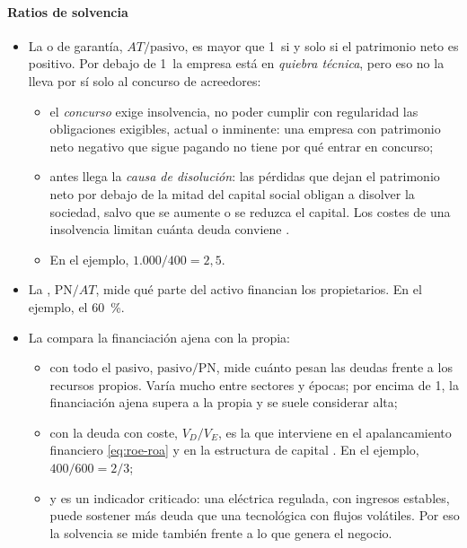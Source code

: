 \documentclass[11pt]{article}
\begin{document}
\begin{infografia}[H]
\centering
\caption{Los equilibrios patrimoniales}\label{figu:equilibrios-patrimoniales}
\end{infografia}

\paragraph{Ratios de solvencia}

\begin{itemize}
\item La  o de garantía, $AT/\text{pasivo}$, es mayor que 1~si y solo si el patrimonio neto es positivo. Por debajo de 1~la empresa está en \emph{quiebra técnica}, pero eso no la lleva por sí solo al concurso de acreedores:
  \begin{itemize}
  \item el \emph{concurso} exige insolvencia, no poder cumplir con regularidad las obligaciones exigibles, actual o inminente: una empresa con patrimonio neto negativo que sigue pagando no tiene por qué entrar en concurso\nocite{BOE2020TRLC};
  \item antes llega la \emph{causa de disolución}: las pérdidas que dejan el patrimonio neto por debajo de la mitad del capital social obligan a disolver la sociedad, salvo que se aumente o se reduzca el capital\nocite{LSC2010}. Los costes de una insolvencia limitan cuánta deuda conviene .
  \item En el ejemplo, $1.000/400=2{,}5$.
  \end{itemize}
\item La , $\mathrm{PN}/AT$, mide qué parte del activo financian los propietarios. En el ejemplo, el 60~\%.
\item La  compara la financiación ajena con la propia:
  \begin{itemize}
  \item con todo el pasivo, $\text{pasivo}/\mathrm{PN}$, mide cuánto pesan las deudas frente a los recursos propios. Varía mucho entre sectores y épocas; por encima de 1, la financiación ajena supera a la propia y se suele considerar alta;
  \item con la deuda con coste, $V_D/V_E$, es la que interviene en el apalancamiento financiero \eqref{eq:roe-roa} y en la estructura de capital . En el ejemplo, $400/600=2/3$;
  \item y es un indicador criticado: una eléctrica regulada, con ingresos estables, puede sostener más deuda que una tecnológica con flujos volátiles. Por eso la solvencia se mide también frente a lo que genera el negocio.
  \end{itemize}
\end{itemize}
\end{document}
